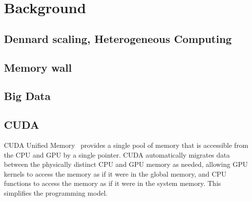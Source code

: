 \chapter{Background}


\section{Dennard scaling, Heterogeneous Computing}

\section{Memory wall}

\section{Big Data}

\section{CUDA}

CUDA Unified Memory~\cite{harris2013cudaunifiedmemory} provides a single pool of memory that is accessible from the CPU and GPU by a single pointer.
CUDA automatically migrates data between the physically distinct CPU and GPU memory as needed, allowing GPU kernels to access the memory as if it were in the global memory, and CPU functions to access the memory as if it were in the system memory.
This simplifies the programming model.
